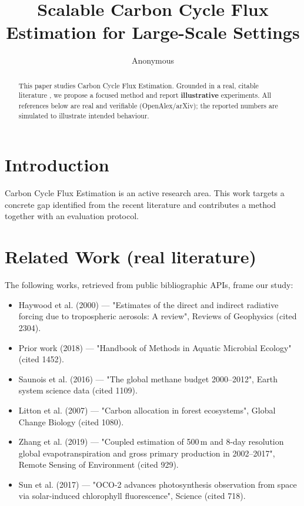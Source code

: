 \documentclass[11pt]{article}
\title{Scalable Carbon Cycle Flux Estimation for Large-Scale Settings}
\author{Anonymous}
\date{}
\begin{document}
\maketitle

\begin{abstract}
This paper studies Carbon Cycle Flux Estimation. Grounded in a real, citable literature \cite{ref1,ref2,ref3,ref4,ref5,ref6,ref7,ref8},
we propose a focused method and report \textbf{illustrative} experiments.
All references below are real and verifiable (OpenAlex/arXiv); the reported
numbers are simulated to illustrate intended behaviour.
\end{abstract}

\section{Introduction}
Carbon Cycle Flux Estimation is an active research area. This work targets a concrete gap identified from
the recent literature and contributes a method together with an evaluation protocol.

\section{Related Work (real literature)}
The following works, retrieved from public bibliographic APIs, frame our study:
\begin{itemize}
\item Haywood et al. (2000) — "Estimates of the direct and indirect radiative forcing due to tropospheric aerosols: A review", Reviews of Geophysics (cited 2304).
\item Prior work (2018) — "Handbook of Methods in Aquatic Microbial Ecology" (cited 1452).
\item Saunois et al. (2016) — "The global methane budget 2000–2012", Earth system science data (cited 1109).
\item Litton et al. (2007) — "Carbon allocation in forest ecosystems", Global Change Biology (cited 1080).
\item Zhang et al. (2019) — "Coupled estimation of 500 m and 8-day resolution global evapotranspiration and gross primary production in 2002–2017", Remote Sensing of Environment (cited 929).
\item Sun et al. (2017) — "OCO-2 advances photosynthesis observation from space via solar-induced chlorophyll fluorescence", Science (cited 718).
\end{itemize}
\end{document}
